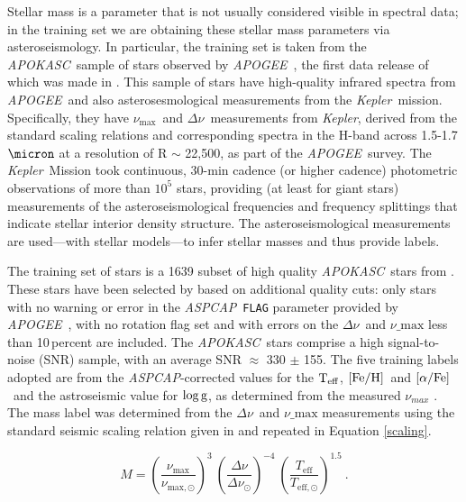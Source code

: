 \documentclass[12pt, preprint]{aastex}
\newcommand{\project}[1]{\textsl{#1}}
\newcommand{\tc}{\project{The~Cannon}}
\newcommand{\apogee}{\project{APOGEE}}
\newcommand{\apokasc}{\project{APOKASC}}
\newcommand{\aspcap}{\project{ASPCAP}}
\newcommand{\kepler}{\project{Kepler}}
\newcommand{\code}[1]{\texttt{#1}}
\newcommand{\teff}{\mbox{$\rm T_{eff}$}}
\newcommand{\feh}{\mbox{$\rm [Fe/H]$}}
\newcommand{\alphafe}{\mbox{$\rm [\alpha/Fe]$}}
\newcommand{\logg}{\mbox{$\rm \log g$}}
\newcommand{\numax}{$\nu_{\max}$}
\newcommand{\deltanu}{$\Delta\nu$}
\begin{document}
Stellar mass is a parameter that is not usually considered visible in
spectral data; in the training set we are obtaining these stellar mass
parameters via asteroseismology. In particular, the training set is taken from the \apokasc\ sample of
stars observed by \apogee\ \citep{Majewski2012}, the first data release of which was made in \citet{P2014}. 
This sample of stars have high-quality infrared
spectra from \apogee\ and also asterosesmological measurements from the \kepler\ mission.
Specifically, they have \numax\ and \deltanu\ measurements from \kepler, derived from the standard scaling relations \citep[see][and references therein]{P2014} and corresponding spectra in the H-band across 1.5-1.7 $\micron$ at a resolution of R $\sim$ 22,500, as part of the \apogee\ survey. 
The \kepler\ Mission \citep{B2010} took continuous, 30-min cadence (or
higher cadence) photometric observations of more than $10^5$ stars,
providing (at least for giant stars) measurements of the
asteroseismological frequencies and frequency splittings that indicate
stellar interior density structure.
The asteroseismological measurements are used---with stellar
models---to infer stellar masses and thus provide labels.

The training set of stars is a 1639 subset of high quality \apokasc\ stars from \citet{Martig2014}. These stars have been selected by \citet{Martig2014} based on additional quality cuts: only stars with no warning or error in the \aspcap\ \code{FLAG} parameter provided by \apogee\ \citep{Ahn2014}, with no rotation flag set and with errors on the  \deltanu\ and $\nu\_{\mbox{max}}$ less than 10\,percent are included. The \apokasc\ stars comprise a high signal-to-noise (SNR) sample, with an average SNR $\approx$ 330 $\pm$ 155. 
%
 The five training labels adopted are from the \aspcap-corrected \citep{Meszaros2013} values for the \teff, \feh\ and \alphafe\ and the astroseismic value for \logg, as determined from the measured $\nu_{max}$ . The mass label was determined from the  \deltanu\ and $\nu\_{\mbox{max}}$ measurements using the standard seismic scaling relation given in \citet{SilvaA2011,Chaplin2011} and repeated in Equation \ref{scaling}.

\begin{equation} \label{eq:mass}
M= \left( \frac{\nu_{\mathrm{max}}}{\nu_{\mathrm{max,\odot}}}\right)^3\  \left( \frac{\Delta \nu}{\Delta \nu_{\odot}}\right)^{-4} \ \left( \frac{T_{\mathrm{eff}}}{T_{\mathrm{eff,\odot}}}\right)^{1.5} \ .
\end{equation}
\label{scaling}
\end{document}
